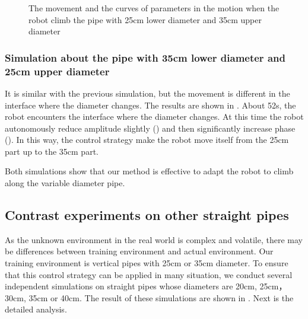 \begin{figure}[!h]
	\caption{The movement and the curves of parameters in the motion when the robot climb the pipe with 25cm lower diameter and 35cm upper diameter}
\end{figure}

\subsubsection{Simulation about the pipe with 35cm lower diameter and 25cm upper diameter}
It is similar with the previous simulation, but the movement is different in the interface where the diameter changes. The results are shown in . About 52s, the robot encounters the interface where the diameter changes. At this time the robot autonomously reduce amplitude slightly () and then significantly increase  phase (). In this way, the control strategy make the robot move itself from the 25cm part up to the 35cm part. 

Both simulations show that our method is effective to adapt the robot to climb along the variable diameter pipe.

\subsection{Contrast experiments on other straight pipes}

As the unknown environment in the real world is complex and volatile, there may be differences between training environment and actual environment. Our training environment is vertical pipes with 25cm or 35cm diameter. To ensure that this control strategy can be applied in many situation, we conduct several  independent simulations on straight pipes whose diameters are 20cm, 25cm， 30cm, 35cm or 40cm. The result of these simulations are shown in . Next is the detailed analysis.

